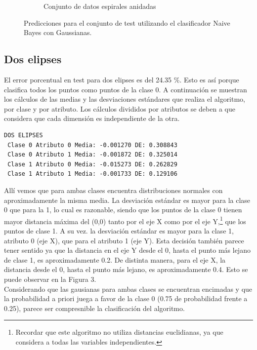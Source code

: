\documentclass[12pt, a4paper]{article}
\begin{document}
\begin{figure}
\begin{subfigure}[b]{0.45\textwidth}
        \caption{Conjunto de datos espirales anidadas}
    \end{subfigure}
    \caption{Predicciones para el conjunto de test utilizando el clasificador  Naive Bayes con Gaussianas. }
\end{figure}

\subsection*{Dos elipses}
 El error porcentual en test para dos elipses es del 24.35 \%. Esto es así porque clasifica todos los puntos como puntos de la clase 0. A continuación se muestran los cálculos de las medias y las desviaciones estándares que realiza el algoritmo, por clase y por atributo. Los cálculos divididos por atributos se deben a que considera que cada dimensión es independiente de la otra.

\newpage
\begin{verbatim}
DOS ELIPSES
 Clase 0 Atributo 0 Media: -0.001270 DE: 0.308843
 Clase 0 Atributo 1 Media: -0.001872 DE: 0.325014
 Clase 1 Atributo 0 Media: -0.015273 DE: 0.262829
 Clase 1 Atributo 1 Media: -0.001733 DE: 0.129106
\end{verbatim}

Allí vemos que para ambas clases encuentra distribuciones normales con aproximadamente la misma media. La desviación estándar es mayor para la clase 0 que para la 1, lo cual es razonable, siendo que los puntos de la clase 0 tienen mayor distancia máxima del (0,0) tanto por el eje X como por el eje Y,\footnote{Recordar que este algoritmo no utiliza distancias euclidianas, ya que considera a todas las variables independientes.} que los puntos de clase 1. A su vez. la desviación estándar es mayor para la clase 1, atributo 0 (eje X), que para el atributo 1 (eje Y). Esta decisión también parece tener sentido ya que la distancia en el eje Y desde el 0, hasta el punto más lejano de clase 1, es aproximadamente 0.2. De distinta manera, para el eje X, la distancia desde el 0, hasta el punto más lejano, es aproximadamente 0.4. Esto se puede observar en la Figura 3.\\
Considerando que las gausianas para ambas clases se encuentran encimadas y que la probabilidad a priori juega a favor de la clase 0 (0.75 de probabilidad frente a 0.25), parece ser compresnible la clasificación del algoritmo.
\end{document}
